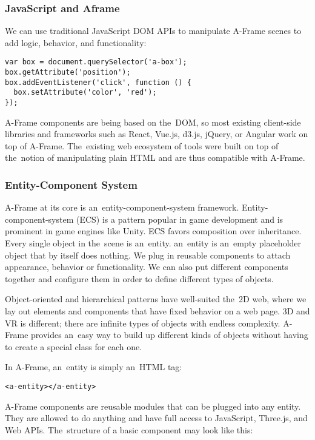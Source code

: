\subsubsection{JavaScript and Aframe}
We can use traditional JavaScript DOM APIs to manipulate A-Frame scenes to add logic, behavior, and functionality:

\begin{lstlisting}
var box = document.querySelector('a-box');
box.getAttribute('position');
box.addEventListener('click', function () {
  box.setAttribute('color', 'red');
});
\end{lstlisting}

A-Frame components are being based on the~DOM, so most existing client-side libraries and frameworks such as React, Vue.js, d3.js, jQuery, or Angular work on top of A-Frame. The~existing web ecosystem of tools were built on top of the~notion of manipulating plain HTML and are thus compatible with A-Frame. \cite{aframe-intro}

\subsubsection{Entity-Component System}
A-Frame at its core is an~entity-component-system framework. Entity-component-system (ECS) is a pattern popular in game development and is prominent in game engines like Unity. ECS favors composition over inheritance. Every single object in the~scene is an~entity. an~entity is an~empty placeholder object that by itself does nothing. We plug in reusable components to attach appearance, behavior or functionality. We can also put different components together and configure them in order to define different types of objects. \cite{aframe-intro}

Object-oriented and hierarchical patterns have well-suited the~2D web, where we lay out elements and components that have fixed behavior on a web page. 3D and VR is different; there are infinite types of objects with endless complexity. A-Frame provides an~easy way to build up different kinds of objects without having to create a special class for each one. \cite{aframe-intro}

In A-Frame, an~entity is simply an~HTML tag:

\begin{lstlisting}
<a-entity></a-entity>
\end{lstlisting}

A-Frame components are reusable modules that can be plugged into any entity. They are allowed to do anything and have full access to JavaScript, Three.js, and Web APIs. The~structure of a basic component may look like this:

